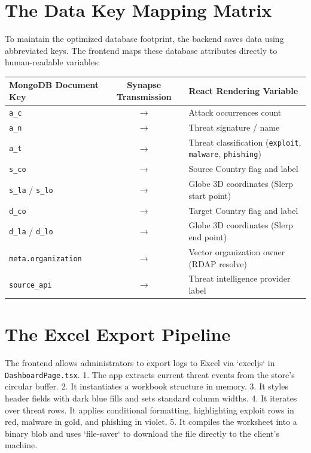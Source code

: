 \documentclass[11pt,a4paper]{report}
\begin{document}
\section{The Data Key Mapping Matrix}
To maintain the optimized database footprint, the backend saves data using abbreviated keys. The frontend maps these database attributes directly to human-readable variables:
\begin{longtable}{lcl}
\toprule
\textbf{MongoDB Document Key} & \textbf{Synapse Transmission} & \textbf{React Rendering Variable} \\
\midrule
\texttt{a\_c} & $\longrightarrow$ & Attack occurrences count \\
\texttt{a\_n} & $\longrightarrow$ & Threat signature / name \\
\texttt{a\_t} & $\longrightarrow$ & Threat classification (\texttt{exploit}, \texttt{malware}, \texttt{phishing}) \\
\texttt{s\_co} & $\longrightarrow$ & Source Country flag and label \\
\texttt{s\_la} / \texttt{s\_lo} & $\longrightarrow$ & Globe 3D coordinates (Slerp start point) \\
\texttt{d\_co} & $\longrightarrow$ & Target Country flag and label \\
\texttt{d\_la} / \texttt{d\_lo} & $\longrightarrow$ & Globe 3D coordinates (Slerp end point) \\
\texttt{meta.organization} & $\longrightarrow$ & Vector organization owner (RDAP resolve) \\
\texttt{source\_api} & $\longrightarrow$ & Threat intelligence provider label \\
\bottomrule
\end{longtable}

\section{The Excel Export Pipeline}
The frontend allows administrators to export logs to Excel via `exceljs` in \texttt{DashboardPage.tsx}.
1. The app extracts current threat events from the store's circular buffer.
2. It instantiates a workbook structure in memory.
3. It styles header fields with dark blue fills and sets standard column widths.
4. It iterates over threat rows. It applies conditional formatting, highlighting exploit rows in red, malware in gold, and phishing in violet.
5. It compiles the worksheet into a binary blob and uses `file-saver` to download the file directly to the client's machine.
\end{document}
